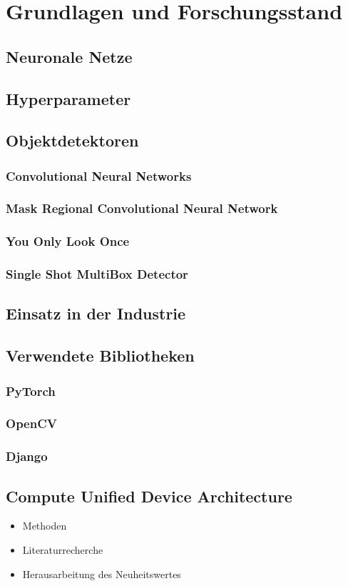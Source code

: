 \chapter{Grundlagen und Forschungsstand}

\section{Neuronale Netze}


\section{Hyperparameter}


\section{Objektdetektoren}

\subsection{Convolutional Neural Networks}

\subsection{Mask Regional Convolutional Neural Network}

\subsection{You Only Look Once}

\subsection{Single Shot MultiBox Detector}


\section{Einsatz in der Industrie}


\section{Verwendete Bibliotheken}

\subsection{PyTorch}

\subsection{OpenCV}

\subsection{Django}


\section{Compute Unified Device Architecture}


\begin{itemize}
	\item Methoden
	\item Literaturrecherche
	\item Herausarbeitung des Neuheitswertes 
\end{itemize}
